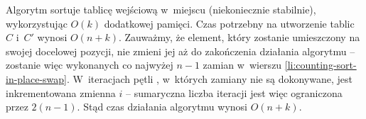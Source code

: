 Algorytm sortuje tablicę wejściową w~miejscu (niekoniecznie stabilnie), wykorzystując $O(k)$ dodatkowej pamięci.
Czas potrzebny na utworzenie tablic $C$ i~$C'$ wynosi $O(n+k)$.
Zauważmy, że element, który zostanie umieszczony na swojej docelowej pozycji, nie zmieni jej aż do zakończenia działania algorytmu -- zostanie więc wykonanych co najwyżej $n-1$ zamian w~wierszu \ref{li:counting-sort-in-place-swap}.
W~iteracjach pętli , w~których zamiany nie są dokonywane, jest inkrementowana zmienna $i$ -- sumaryczna liczba iteracji jest więc ograniczona przez $2(n-1)$.
Stąd czas działania algorytmu wynosi $O(n+k)$.
